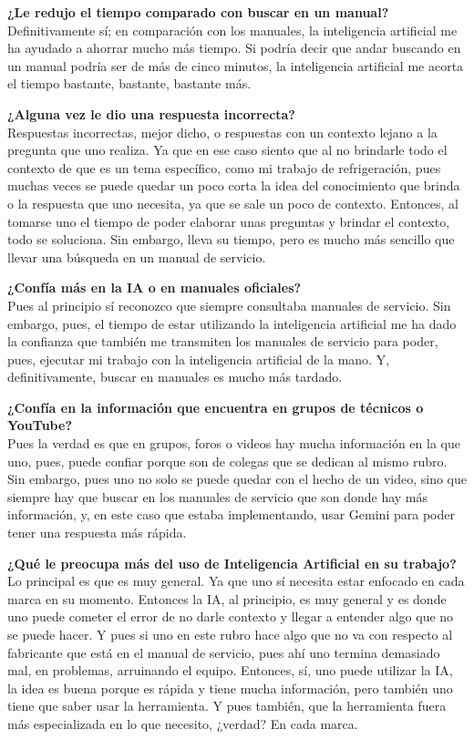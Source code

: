 {{    \textbf{¿Le redujo el tiempo comparado con buscar en un manual?}\\
    Definitivamente sí; en comparación con los manuales, la inteligencia artificial me ha ayudado a ahorrar mucho más tiempo. Si podría decir que andar buscando en un manual podría ser de más de cinco minutos, la inteligencia artificial me acorta el tiempo bastante, bastante, bastante más.

    \textbf{¿Alguna vez le dio una respuesta incorrecta?}\\
    Respuestas incorrectas, mejor dicho, o respuestas con un contexto lejano a la pregunta que uno realiza. Ya que en ese caso siento que al no brindarle todo el contexto de que es un tema específico, como mi trabajo de refrigeración, pues muchas veces se puede quedar un poco corta la idea del conocimiento que brinda o la respuesta que uno necesita, ya que se sale un poco de contexto. Entonces, al tomarse uno el tiempo de poder elaborar unas preguntas y brindar el contexto, todo se soluciona. Sin embargo, lleva su tiempo, pero es mucho más sencillo que llevar una búsqueda en un manual de servicio.

    \textbf{¿Confía más en la IA o en manuales oficiales?}\\
    Pues al principio sí reconozco que siempre consultaba manuales de servicio. Sin embargo, pues, el tiempo de estar utilizando la inteligencia artificial me ha dado la confianza que también me transmiten los manuales de servicio para poder, pues, ejecutar mi trabajo con la inteligencia artificial de la mano. Y, definitivamente, buscar en manuales es mucho más tardado.

    \textbf{¿Confía en la información que encuentra en grupos de técnicos o YouTube?}\\
    Pues la verdad es que en grupos, foros o videos hay mucha información en la que uno, pues, puede confiar porque son de colegas que se dedican al mismo rubro. Sin embargo, pues uno no solo se puede quedar con el hecho de un video, sino que siempre hay que buscar en los manuales de servicio que son donde hay más información, y, en este caso que estaba implementando, usar Gemini para poder tener una respuesta más rápida.

    \textbf{¿Qué le preocupa más del uso de Inteligencia Artificial en su trabajo?}\\
    Lo principal es que es muy general. Ya que uno sí necesita estar enfocado en cada marca en su momento. Entonces la IA, al principio, es muy general y es donde uno puede cometer el error de no darle contexto y llegar a entender algo que no se puede hacer. Y pues si uno en este rubro hace algo que no va con respecto al fabricante que está en el manual de servicio, pues ahí uno termina demasiado mal, en problemas, arruinando el equipo. Entonces, sí, uno puede utilizar la IA, la idea es buena porque es rápida y tiene mucha información, pero también uno tiene que saber usar la herramienta. Y pues también, que la herramienta fuera más especializada en lo que necesito, ¿verdad? En cada marca.

}}
